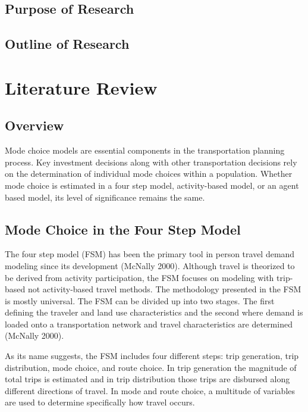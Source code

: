 \documentclass[12pt, oneside, openright]{byuthesis}
\begin{document}
\hypertarget{purpose-of-research}{%
\section{Purpose of Research}\label{purpose-of-research}}

\hypertarget{outline-of-research}{%
\section{Outline of Research}\label{outline-of-research}}

\hypertarget{literature-review}{%
\chapter{Literature Review}\label{literature-review}}

\hypertarget{overview}{%
\section{Overview}\label{overview}}

Mode choice models are essential components in the transportation planning process. Key investment decisions along with other transportation decisions rely on the determination of individual mode choices within a population. Whether mode choice is estimated in a four step model, activity-based model, or an agent based model, its level of significance remains the same.

\hypertarget{lit1}{%
\section{Mode Choice in the Four Step Model}\label{lit1}}

The four step model (FSM) has been the primary tool in person travel demand modeling since its development (McNally 2000). Although travel is theorized to be derived from activity participation, the FSM focuses on modeling with trip-based not activity-based travel methods. The methodology presented in the FSM is mostly universal. The FSM can be divided up into two stages. The first defining the traveler and land use characteristics and the second where demand is loaded onto a transportation network and travel characteristics are determined (McNally 2000).

As its name suggests, the FSM includes four different steps: trip generation, trip distribution, mode choice, and route choice. In trip generation the magnitude of total trips is estimated and in trip distribution those trips are disbursed along different directions of travel. In mode and route choice, a multitude of variables are used to determine specifically how travel occurs.
\end{document}
